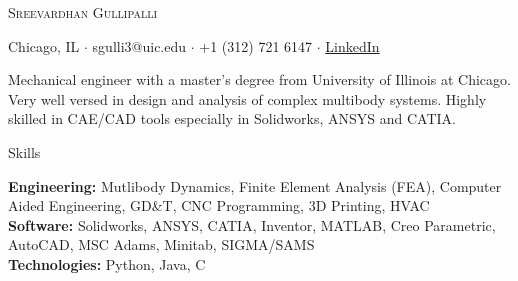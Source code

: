 \documentclass{resume}
\begin{document}
\vspace*{-40pt}

\vspace*{-10pt}
\begin{center}
	{\Huge \scshape {Sreevardhan Gullipalli}}\\
	\end{center}
\begin{center}
	Chicago, IL $\cdot$ sgulli3@uic.edu $\cdot$ +1 (312) 721 6147 $\cdot$ \href{https://www.linkedin.com/in/sreevardhan-g-658175119/}{LinkedIn}
\end{center}
\vspace{3mm}

Mechanical engineer with a master’s degree from University of Illinois at Chicago. Very well versed in design and analysis of complex multibody systems. Highly skilled in CAE/CAD tools especially in Solidworks, ANSYS and CATIA.


\begin{rSection}{Skills}

\textbf{Engineering:} Mutlibody Dynamics, Finite Element Analysis (FEA), Computer Aided Engineering, GD\&T, CNC Programming, 3D Printing, HVAC
\\\textbf{Software:} Solidworks, ANSYS, CATIA, Inventor, MATLAB, Creo Parametric, AutoCAD, MSC Adams, Minitab, SIGMA/SAMS
\\\textbf{Technologies:} Python, Java, C
\end{rSection}



\end{document}
